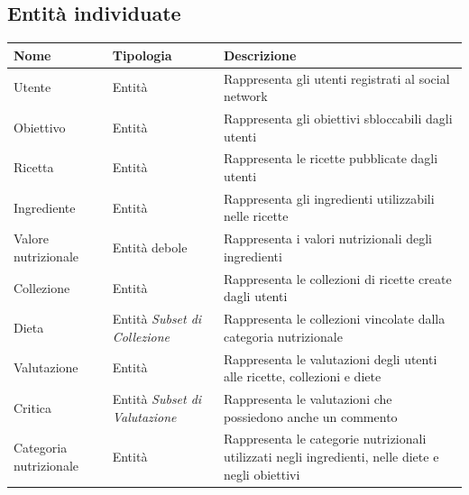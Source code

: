 ﻿\documentclass[a4paper,12pt]{report}
\begin{document}
\subsection{Entità individuate}
\begin{table}[h!]
    \centering
    \begin{tabular}{ |p{1.2in}|p{1.2in}|p{2.4in}| }
        \hline
        \scriptsize{\textbf{Nome}} & \scriptsize{\textbf{Tipologia}} & \scriptsize{\textbf{Descrizione}} \\
        \hline
        \scriptsize{Utente} & \scriptsize{Entità} & \scriptsize{Rappresenta gli utenti registrati al social network} \\
        \hline
        \scriptsize{Obiettivo} & \scriptsize{Entità} & \scriptsize{Rappresenta gli obiettivi sbloccabili dagli utenti} \\
        \hline
        \scriptsize{Ricetta} & \scriptsize{Entità} & \scriptsize{Rappresenta le ricette pubblicate dagli utenti} \\
        \hline
        \scriptsize{Ingrediente} & \scriptsize{Entità} & \scriptsize{Rappresenta gli ingredienti utilizzabili nelle ricette} \\
        \hline
        \scriptsize{Valore nutrizionale} & \scriptsize{Entità debole} & \scriptsize{Rappresenta i valori nutrizionali degli ingredienti} \\
        \hline
        \scriptsize{Collezione} & \scriptsize{Entità} & \scriptsize{Rappresenta le collezioni di ricette create dagli utenti} \\
        \hline
        \scriptsize{Dieta} & \scriptsize{Entità \newline \textit{Subset di Collezione}} & \scriptsize{Rappresenta le collezioni vincolate dalla categoria nutrizionale} \\
        \hline
        \scriptsize{Valutazione} & \scriptsize{Entità} & \scriptsize{Rappresenta le valutazioni degli utenti alle ricette, collezioni e diete} \\
        \hline
        \scriptsize{Critica} & \scriptsize{Entità \newline \textit{Subset di Valutazione}} & \scriptsize{Rappresenta le valutazioni che possiedono anche un commento} \\
        \hline
        \scriptsize{Categoria nutrizionale} & \scriptsize{Entità} & \scriptsize{Rappresenta le categorie nutrizionali utilizzati negli ingredienti, nelle diete e negli obiettivi} \\
        \hline
    \end{tabular}
\end{table}
\end{document}
